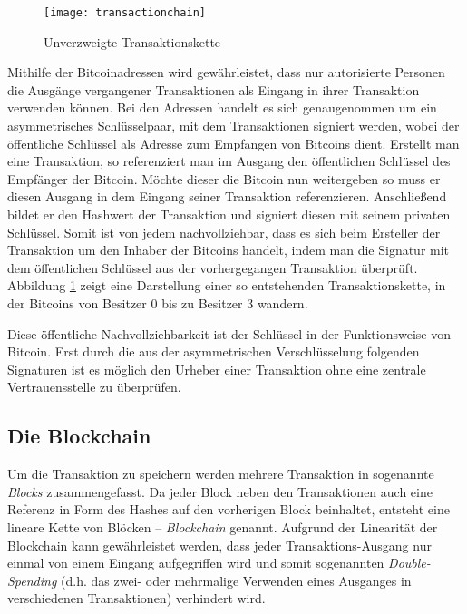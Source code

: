 \begin{figure}
    \begin{center}
        \texttt{[image: transactionchain]}
    	\caption{Unverzweigte Transaktionskette \parencite[2]{nakamoto}}
    	\label{fig:transactionchain}
    \end{center}
\end{figure}

Mithilfe der Bitcoinadressen wird gewährleistet, dass nur autorisierte Personen die Ausgänge vergangener Transaktionen als Eingang in ihrer Transaktion verwenden können.
Bei den Adressen handelt es sich genaugenommen um ein asymmetrisches Schlüsselpaar, mit dem Transaktionen signiert werden, wobei der öffentliche Schlüssel als Adresse zum Empfangen von Bitcoins dient.
Erstellt man eine Transaktion, so referenziert man im Ausgang den öffentlichen Schlüssel des Empfänger der Bitcoin.
Möchte dieser die Bitcoin nun weitergeben so muss er diesen Ausgang in dem Eingang seiner Transaktion referenzieren.
Anschließend bildet er den Hashwert der Transaktion und signiert diesen mit seinem privaten Schlüssel.
Somit ist von jedem nachvollziehbar, dass es sich beim Ersteller der Transaktion um den Inhaber der Bitcoins handelt, indem man die Signatur mit dem öffentlichen Schlüssel aus der vorhergegangen Transaktion überprüft.
Abbildung \ref{fig:transactionchain} zeigt eine Darstellung einer so entstehenden Transaktionskette, in der Bitcoins von Besitzer 0 bis zu Besitzer 3 wandern.

Diese öffentliche Nachvollziehbarkeit ist der Schlüssel in der Funktionsweise von Bitcoin.
Erst durch die aus der asymmetrischen Verschlüsselung folgenden Signaturen ist es möglich den Urheber einer Transaktion ohne eine zentrale Vertrauensstelle zu überprüfen.

\subsection{Die Blockchain}

Um die Transaktion zu speichern werden mehrere Transaktion in sogenannte \emph{Blocks} zusammengefasst.
Da jeder Block neben den Transaktionen auch eine Referenz in Form des Hashes auf den vorherigen Block beinhaltet, entsteht eine lineare Kette von Blöcken -- \emph{Blockchain} genannt.
Aufgrund der Linearität der Blockchain kann gewährleistet werden, dass jeder Transaktions-Ausgang nur einmal von einem Eingang aufgegriffen wird und somit sogenannten \emph{Double-Spending} (d.h. das zwei- oder mehrmalige Verwenden eines Ausganges in verschiedenen Transaktionen) verhindert wird.

